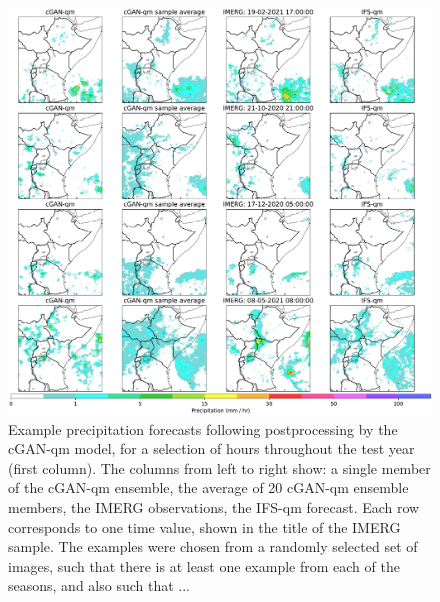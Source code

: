 \documentclass{article}
\begin{document}
\begin{figure}[ht!]
     \centering
     \includegraphics[width=1.05\textwidth]{images/cGAN_samples_IFS_final-nologs_217600.pdf}
     
     \caption{Example precipitation forecasts following postprocessing by the cGAN-qm model, for a selection of hours throughout the test year (first column). The columns from left to right show: a single member of the cGAN-qm ensemble, the average of 20 cGAN-qm ensemble members, the IMERG observations, the IFS-qm forecast. Each row corresponds to one time value, shown in the title of the IMERG sample. The examples were chosen from a randomly selected set of images, such that there is at least one example from each of the seasons, and also such that ...  }
     \label{fig:examples}
\end{figure}
\end{document}
